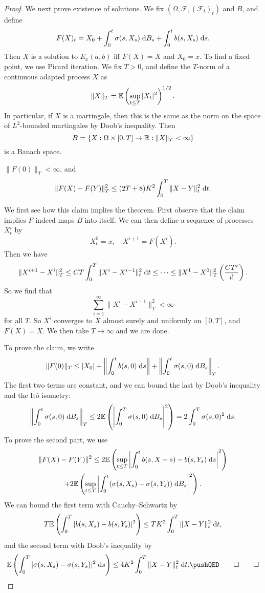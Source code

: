 \documentclass[a4paper]{article}
\begin{document}
\begin{proof}
  We next prove existence of solutions. We fix $(\Omega, \mathcal{F}, (\mathcal{F}_t)_t)$ and $B$, and define
  \[
    F(X)_t = X_0 + \int_0^t \sigma(s, X_s)\;\mathrm{d} B_s + \int_0^t b(s, X_s) \;\mathrm{d} s.
  \]
  Then $X$ is a solution to $E_x(a, b)$ iff $F(X) = X$ and $X_0 = x$. To find a fixed point, we use Picard iteration. We fix $T > 0$, and define the $T$-norm of a continuous adapted process $X$ as
  \[
    \|X\|_T = \mathbb{E}\left(\sup_{t \leq T} |X_t|^2\right)^{1/2}.
  \]
  In particular, if $X$ is a martingale, then this is the same as the norm on the space of $L^2$-bounded martingales by Doob's inequality. Then
  \[
    B = \{X: \Omega \times [0, T] \to \mathbb{R}: \|X\|_T < \infty\}
  \]
  is a Banach space.
  \begin{claim}
    $\|F(0)\|_T < \infty$, and
    \[
      \|F(X) - F(Y)\|_T^2 \leq (2T + 8)K^2 \int_0^T \|X - Y\|_t^2 \;\mathrm{d} t.
    \]
  \end{claim}
  We first see how this claim implies the theorem. First observe that the claim implies $F$ indeed maps $B$ into itself. We can then define a sequence of processes $X^i_t$ by
  \[
    X_t^0 = x,\quad
    X^{i + 1} = F(X^i).
  \]
  Then we have
  \[
    \|X^{i + 1} - X^i\|_T^2 \leq CT \int_0^T \|X^i - X^{i - 1}\|^2_t \;\mathrm{d} t \leq \cdots \leq \|X^1 - X^0\|^2_T \left(\frac{CT^i}{i!}\right).
  \]
  So we find that
  \[
    \sum_{i = 1}^\infty \|X^i - X^{i - 1}\|_T^2 < \infty
  \]
  for all $T$. So $X^i$ converges to $X$ almost surely and uniformly on $[0, T]$, and $F(X) = X$. We then take $T \to \infty$ and we are done.

  To prove the claim, we write
  \[
    \|F(0)\|_T \leq |X_0| + \left\| \int_0^t b(s, 0) \;\mathrm{d} s\right\| + \left\| \int_0^t \sigma(s, 0) \;\mathrm{d} B_s\right\|_T.
  \]
  The first two terms are constant, and we can bound the last by Doob's inequality and the It\^o isometry:
  \[
    \left\| \int_0^t \sigma(s, 0) \;\mathrm{d} B_s\right\|_T \leq 2 \mathbb{E} \left(\left|\int_0^T \sigma(s, 0) \;\mathrm{d} B_s\right|^2\right) = 2 \int_0^T \sigma(s, 0)^2 \;\mathrm{d} s.
  \]
  To prove the second part, we use
  \begin{multline*}
    \|F(X) - F(Y)\|^2 \leq 2 \mathbb{E} \left(\sup_{t \leq T} \left|\int_0^t b(s, X-s) - b(s, Y_s)\;\mathrm{d} s\right|^2\right) \\
    + 2 \mathbb{E} \left(\sup_{t \leq T} \left|\int_0^t(\sigma(s, X_s) - \sigma(s, Y_s))\;\mathrm{d} B_s\right|^2\right).
  \end{multline*}
  We can bound the first term with Cauchy--Schwartz by
  \[
    T \mathbb{E} \left(\int_0^T |b(s, X_s) - b(s, Y_s)|^2 \right) \leq TK^2 \int_0^T \|X -Y \|_t^2 \;\mathrm{d} t,
  \]
  and the second term with Doob's inequality by
  \[
    \E \left(\int_0^T |\sigma(s, X_s) - \sigma(s, Y_s)|^2 \;\d s\right) \leq 4K^2 \int_0^T \|X - Y\|_t^2\;\d t.\fakeqed%
  \]
\end{proof}
\end{document}
